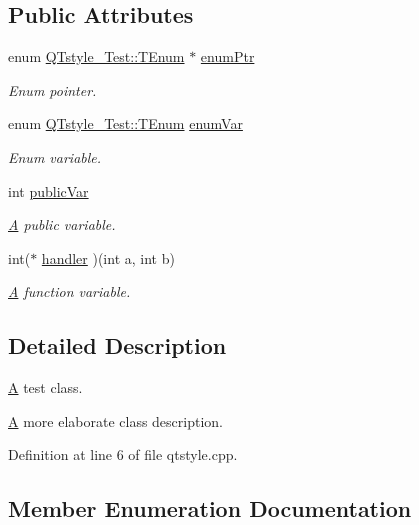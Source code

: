\subsection*{Public Attributes}
\begin{DoxyCompactItemize}
\item 
enum \mbox{\hyperlink{class_q_tstyle___test_a0525f798cda415a94fedeceb806d2c49}{Q\+Tstyle\+\_\+\+Test\+::\+T\+Enum}} $\ast$ \mbox{\hyperlink{class_q_tstyle___test_a973a4566c9a036f4eca508ba5fe80dcb}{enum\+Ptr}}
\begin{DoxyCompactList}\small\item\em Enum pointer. \end{DoxyCompactList}\item 
enum \mbox{\hyperlink{class_q_tstyle___test_a0525f798cda415a94fedeceb806d2c49}{Q\+Tstyle\+\_\+\+Test\+::\+T\+Enum}} \mbox{\hyperlink{class_q_tstyle___test_adb265d815b43f1f7f0de0e8b8852a5d0}{enum\+Var}}
\begin{DoxyCompactList}\small\item\em Enum variable. \end{DoxyCompactList}\item 
int \mbox{\hyperlink{class_q_tstyle___test_aabf7b2e9ed83ea44aca4d213baae06d3}{public\+Var}}
\begin{DoxyCompactList}\small\item\em \mbox{\hyperlink{class_a}{A}} public variable. \end{DoxyCompactList}\item 
int($\ast$ \mbox{\hyperlink{class_q_tstyle___test_a79dd4e5498f09057775a819d911349e2}{handler}} )(int a, int b)
\begin{DoxyCompactList}\small\item\em \mbox{\hyperlink{class_a}{A}} function variable. \end{DoxyCompactList}\end{DoxyCompactItemize}


\subsection{Detailed Description}
\mbox{\hyperlink{class_a}{A}} test class. 

\mbox{\hyperlink{class_a}{A}} more elaborate class description. 

Definition at line 6 of file qtstyle.\+cpp.



\subsection{Member Enumeration Documentation}
\mbox{\label{class_q_tstyle___test_a0525f798cda415a94fedeceb806d2c49}} 
